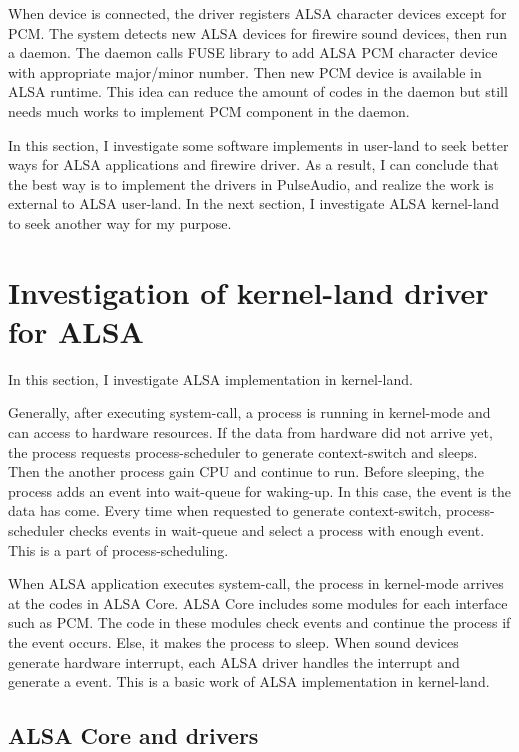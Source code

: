 \documentclass[onecolumn]{article}
\begin{document}
When device is connected, the driver registers ALSA character devices except for PCM. The system detects new ALSA devices for firewire sound devices, then run a daemon. The daemon calls FUSE library to add ALSA PCM character device with appropriate major/minor number. Then new PCM device is available in ALSA runtime. This idea can reduce the amount of codes in the daemon but still needs much works to implement PCM component in the daemon.

In this section, I investigate some software implements in user-land to seek better ways for ALSA applications and firewire driver. As a result, I can conclude that the best way is to implement the drivers in PulseAudio, and realize the work is external to ALSA user-land. In the next section, I investigate ALSA kernel-land to seek another way for my purpose.


\section{Investigation of kernel-land driver for ALSA}

In this section, I investigate ALSA implementation in kernel-land.

Generally, after executing system-call, a process is running in kernel-mode and can access to hardware resources. If the data from hardware did not arrive yet, the process requests process-scheduler to generate context-switch and sleeps. Then the another process gain CPU and continue to run. Before sleeping, the process adds an event into wait-queue for waking-up. In this case, the event is the data has come. Every time when requested to generate context-switch, process-scheduler checks events in wait-queue and select a process with enough event. This is a part of process-scheduling.

When ALSA application executes system-call, the process in kernel-mode arrives at the codes in ALSA Core. ALSA Core includes some modules for each interface such as PCM. The code in these modules check events and continue the process if the event occurs. Else, it makes the process to sleep. When sound devices generate hardware interrupt, each ALSA driver handles the interrupt and generate a event. This is a basic work of ALSA implementation in kernel-land.

\subsection{ALSA Core and drivers}
\end{document}
